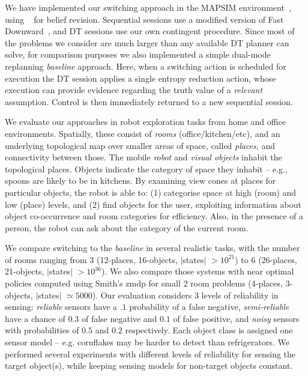 
We have implemented our switching approach in the MAPSIM
environment~\cite{brenner:nebel:jaamas09},
using ~\cite{king:2009} for belief
revision. Sequential sessions use a modified version of Fast
Downward~\cite{fast-downward}, and DT sessions use our own contingent
procedure. Since most of the problems we consider are much larger than
any available DT planner can solve, for comparison purposes we also
implemented a simple dual-mode replanning {\em baseline}
approach. Here, when a switching action is scheduled for execution the
DT session applies a single entropy reduction action, whose execution
can provide evidence regarding the truth value of a {\em relevant}
assumption.
Control is then immediately
returned to a new sequential session.


We evaluate our approaches in robot exploration tasks from home and
office environments. Spatially, these consist of {\em rooms}
(office/kitchen/etc), and an underlying topological map over
smaller areas of space, called {\em places}, and connectivity between
those. The mobile {\em robot} and {\em visual objects} inhabit the
topological places. Objects indicate the category of space they
inhabit -- e.g., spoons are likely to be in kitchens. By examining
view cones at places for particular objects, the robot is able to: (1)
categorise space at high (room) and low (place) levels, and (2) find
objects for the user, exploiting information about object
co-occurrence and room categories for efficiency. Also, in the
presence of a person, the robot can ask about the category of the
current room.


We compare switching to the {\em baseline} in several realistic
tasks, with the number of rooms ranging from 3 (12-places, 16-objects,
$|$states$|$ $>10^{21}$) to 6 (26-places, 21-objects, $|$states$|$
$>10^{36}$). We also compare those systems with near optimal policies
computed using Smith's {\sc zmdp} for small 2 room problems (4-places,
3-objects, $|$states$|$ $\simeq 5000$). Our evaluation considers 3
levels of reliability in sensing: {\em reliable} sensors have a $.1$
probability of a false negative, {\em semi-reliable} have a chance of
$0.3$ of false negative and $0.1$ of false positive, and {\em noisy}
sensors with probabilities of $0.5$ and $0.2$ respectively. Each
object class is assigned one sensor model -- e.g. cornflakes may be
harder to detect than refrigerators. We performed several experiments
with different levels of reliability for sensing the target object(s),
while keeping sensing models for non-target objects constant.

